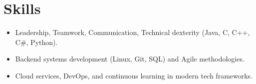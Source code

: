 \section{Skills}
\begin{itemize}
    \item Leadership, Teamwork, Communication, Technical dexterity (Java, C, C++, C\#, Python).
    \item Backend systems development (Linux, Git, SQL) and Agile methodologies.
    \item Cloud services, DevOps, and continuous learning in modern tech frameworks.
\end{itemize}